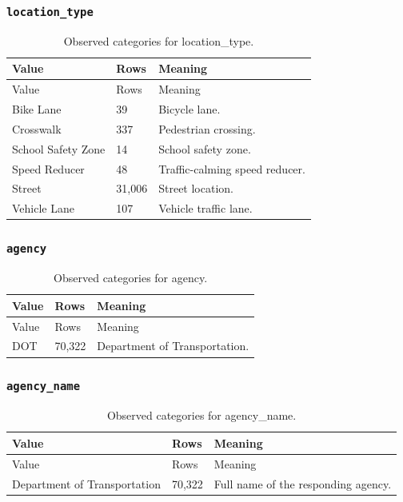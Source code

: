 \subsubsection*{\texttt{location\_\allowbreak{}type}}
\begin{longtable}{@{}p{.32\linewidth}p{.09\linewidth}p{.53\linewidth}@{}}
\caption{Observed categories for location\_type.}\\
\toprule Value & Rows & Meaning\\\midrule\endfirsthead
\toprule Value & Rows & Meaning\\\midrule\endhead
\bottomrule\endfoot
Bike Lane & 39 & Bicycle lane.\\
Crosswalk & 337 & Pedestrian crossing.\\
School Safety Zone & 14 & School safety zone.\\
Speed Reducer & 48 & Traffic-calming speed reducer.\\
Street & 31,006 & Street location.\\
Vehicle Lane & 107 & Vehicle traffic lane.\\
\end{longtable}
\subsubsection*{\texttt{agency}}
\begin{longtable}{@{}p{.32\linewidth}p{.09\linewidth}p{.53\linewidth}@{}}
\caption{Observed categories for agency.}\\
\toprule Value & Rows & Meaning\\\midrule\endfirsthead
\toprule Value & Rows & Meaning\\\midrule\endhead
\bottomrule\endfoot
DOT & 70,322 & Department of Transportation.\\
\end{longtable}
\subsubsection*{\texttt{agency\_\allowbreak{}name}}
\begin{longtable}{@{}p{.32\linewidth}p{.09\linewidth}p{.53\linewidth}@{}}
\caption{Observed categories for agency\_name.}\\
\toprule Value & Rows & Meaning\\\midrule\endfirsthead
\toprule Value & Rows & Meaning\\\midrule\endhead
\bottomrule\endfoot
Department of Transportation & 70,322 & Full name of the responding agency.\\
\end{longtable}
